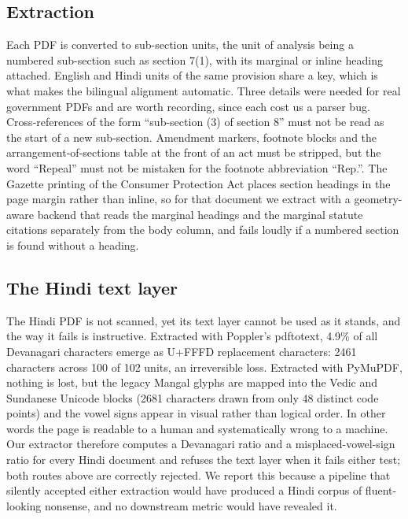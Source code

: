 \documentclass[conference]{IEEEtran}
\begin{document}
\subsection{Extraction}

Each PDF is converted to sub-section units, the unit of analysis being a numbered sub-section such as section 7(1), with its marginal or inline heading attached. English and Hindi units of the same provision share a key, which is what makes the bilingual alignment automatic. Three details were needed for real government PDFs and are worth recording, since each cost us a parser bug. Cross-references of the form “sub-section (3) of section 8” must not be read as the start of a new sub-section. Amendment markers, footnote blocks and the arrangement-of-sections table at the front of an act must be stripped, but the word “Repeal” must not be mistaken for the footnote abbreviation “Rep.”. The Gazette printing of the Consumer Protection Act places section headings in the page margin rather than inline, so for that document we extract with a geometry-aware backend that reads the marginal headings and the marginal statute citations separately from the body column, and fails loudly if a numbered section is found without a heading.

\subsection{The Hindi text layer}

The Hindi PDF is not scanned, yet its text layer cannot be used as it stands, and the way it fails is instructive. Extracted with Poppler's pdftotext, 4.9\% of all Devanagari characters emerge as U+FFFD replacement characters: 2461 characters across 100 of 102 units, an irreversible loss. Extracted with PyMuPDF, nothing is lost, but the legacy Mangal glyphs are mapped into the Vedic and Sundanese Unicode blocks (2681 characters drawn from only 48 distinct code points) and the vowel signs appear in visual rather than logical order. In other words the page is readable to a human and systematically wrong to a machine. Our extractor therefore computes a Devanagari ratio and a misplaced-vowel-sign ratio for every Hindi document and refuses the text layer when it fails either test; both routes above are correctly rejected. We report this because a pipeline that silently accepted either extraction would have produced a Hindi corpus of fluent-looking nonsense, and no downstream metric would have revealed it.
\end{document}
